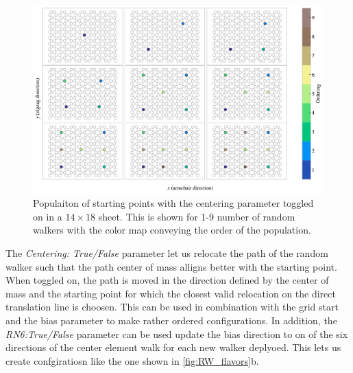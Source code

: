 \begin{figure}[H]
  \centering
  \includegraphics[width=\linewidth]{figures/system/grid_start.pdf}
  \caption{Populaiton of starting points with the centering parameter toggled on in a $14\times 18$ sheet. This is shown for 1-9 number of random walkers with the color map conveying the order of the population.}
  \label{fig:grid_start}
\end{figure}

The \textit{Centering: True/False} parameter let us relocate the path of the random walker such that the path center of mass alligns better with the starting point. When toggled on, the path is moved in the direction defined by the center of mass and the starting point for which the closest valid relocation on the direct translation line is choosen. This can be used in combination with the grid start and the bias parameter to make rather ordered configurations. In addition, the \textit{RN6:True/False} parameter can be used update the bias direction to on of the six directions of the center element walk for each new walker deplyoed. This lets us create confgiratiosn like the one shown in \cref{fig:RW_flavors}\textcolor{red!50!black}{b}. 


